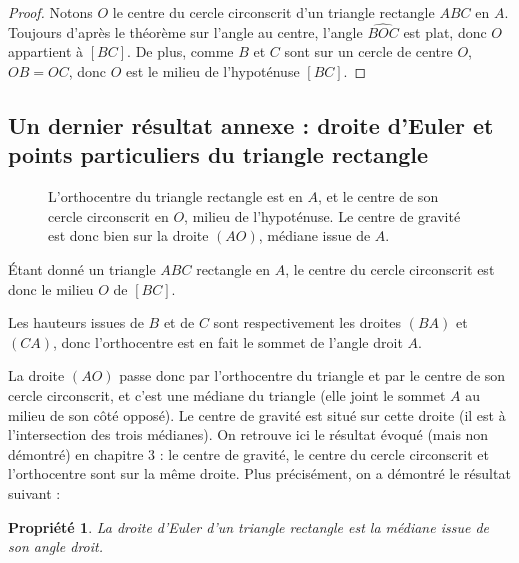 \documentclass[12 pt]{article}
\theoremstyle{plain}
\newcounter{n}
\numberwithin{n}{section}
\newtheorem*{prop}{Propriété}
\begin{document}
\begin{proof}
Notons $O$ le centre du cercle circonscrit d'un triangle rectangle $ABC$ en $A$.
Toujours d'après le théorème sur l'angle au centre, l'angle $\widehat{BOC}$ est plat, donc $O$ appartient à $[BC]$. 
De plus, comme $B$ et $C$ sont sur un cercle de centre $O$, $OB=OC$, donc $O$ est le milieu de l'hypoténuse $[BC]$. 
\end{proof}
\subsection{Un dernier résultat annexe : droite d'Euler et points particuliers du triangle rectangle}

\begin{figure}[H]\center
{}
\caption{L'orthocentre du triangle rectangle est en $A$, et le centre de son cercle circonscrit en $O$, milieu de l'hypoténuse. Le centre de gravité est donc bien sur la droite $(AO)$, médiane issue de $A$. }
\end{figure}
Étant donné un triangle $ABC$  rectangle en $A$, le centre du cercle circonscrit est donc le milieu 
$O$ de $[BC]$. 

Les hauteurs issues de $B$ et de $C$ sont respectivement les droites $(BA)$ et $(CA)$, donc l'orthocentre est en fait 
le sommet de l'angle droit $A$. 

La droite $(AO)$ passe donc par l'orthocentre du triangle et par le centre de son cercle circonscrit, et 
c'est une médiane du triangle (elle joint le sommet $A$ au milieu de son côté opposé). 
Le centre de gravité est situé sur cette droite (il est à l'intersection des trois médianes). On retrouve ici 
le résultat évoqué (mais non démontré) en chapitre $3$ : le centre de gravité, le centre du cercle circonscrit 
et l'orthocentre sont sur la même droite. Plus précisément, on a démontré le résultat suivant : 
\begin{prop}
La droite d'Euler d'un triangle rectangle est la médiane issue de son angle droit.
\end{prop}







	
\end{document}
